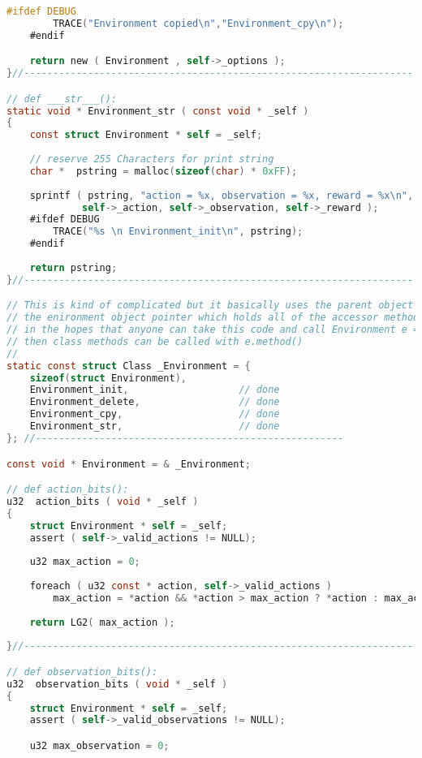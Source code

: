 \documentclass[fancychapters]{report}   	%
\begin{document}
\begin{lstlisting}[language=C,caption={environment.c}]
    #ifdef DEBUG 
        TRACE("Environment copied\n","Environment_cpy\n");
    #endif

    return new ( Environment , self->_options );
}//-------------------------------------------------------------------

// def ___str___():
static void * Environment_str ( const void * _self )
{
    const struct Environment * self = _self;
    
    // reserve 255 Characters for print string
    char *  pstring = malloc(sizeof(char) * 0xFF);
    
    sprintf ( pstring, "action = %x, observation = %x, reward = %x\n",
             self->_action, self->_observation, self->_reward );
    #ifdef DEBUG 
        TRACE("%s \n Environment_init\n", pstring);
    #endif
    
    return pstring;
}//-------------------------------------------------------------------

// This is kind of complicated but it basically uses the parent object class to define
// the enironment object pointer which holds all of the accessor methods.  This is all
// in the hopes that anyone can take this code and call Environment e = new(environment,...)
// then class methods can be called with e.method()
//
static const struct Class _Environment = {
    sizeof(struct Environment),
    Environment_init,                   // done
    Environment_delete,                 // done
    Environment_cpy,                    // done
    Environment_str,                    // done
}; //-----------------------------------------------------

const void * Environment = & _Environment;

// def action_bits():
u32  action_bits ( void * _self )
{
    struct Environment * self = _self;
    assert ( self->_valid_actions != NULL);
    
    u32 max_action = 0;
    
    foreach ( u32 const * action, self->_valid_actions )
        max_action = *action && *action > max_action ? *action : max_action;
    
    return LG2( max_action );
    
}//-------------------------------------------------------------------

// def observation_bits():
u32  observation_bits ( void * _self )
{
    struct Environment * self = _self;
    assert ( self->_valid_observations != NULL);

    u32 max_observation = 0;
    

\end{lstlisting}
\end{document}
